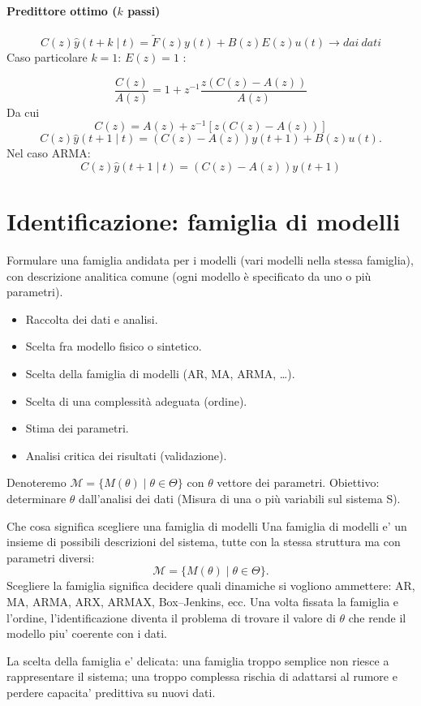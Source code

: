 \documentclass[11pt,a4paper]{article}
\begin{document}
\paragraph{Predittore ottimo ($k$ passi)} 

\[
C(z)\hat y(t+k\mid t)=\tilde F(z)y(t)+B(z)E(z)u(t) \rightarrow dai \ dati
\]
Caso particolare $k=1$: $E(z)=1$ :

\[
\frac{C(z)}{A(z)} = 1+z^{-1}\frac{z(C(z)-A(z))}{A(z)}
\]
Da cui
\[
C(z) = A(z)+z^{-1}[z(C(z)-A(z))]
\]
\[
C(z)\hat y(t+1\mid t)=(C(z)-A(z))y(t+1)+B(z)u(t).
\]
Nel caso ARMA:
\[
C(z)\hat y(t+1\mid t)=(C(z)-A(z))y(t+1)
\]
\section{Identificazione: famiglia di modelli}

Formulare una famiglia andidata per i modelli (vari modelli nella stessa famiglia), con descrizione analitica comune (ogni modello è specificato da uno o più parametri).

\begin{itemize}
  \item Raccolta dei dati e analisi.
  \item Scelta fra modello fisico o sintetico.
  \item Scelta della famiglia di modelli (AR, MA, ARMA, \dots).
  \item Scelta di una complessità adeguata (ordine).
  \item Stima dei parametri.
  \item Analisi critica dei risultati (validazione).
\end{itemize}

Denoteremo $\mathcal{M}=\{M(\theta)\mid \theta\in\Theta\}$ con $\theta$ vettore dei parametri. Obiettivo: determinare $\theta$ dall'analisi dei dati (Misura di una o più variabili sul sistema S).

\begin{spiegazione}{Che cosa significa scegliere una famiglia di modelli}
Una famiglia di modelli e' un insieme di possibili descrizioni del sistema, tutte con la stessa struttura ma con parametri diversi:
\[
\mathcal M=\{M(\theta)\mid \theta\in\Theta\}.
\]
Scegliere la famiglia significa decidere quali dinamiche si vogliono ammettere: AR, MA, ARMA, ARX, ARMAX, Box--Jenkins, ecc. Una volta fissata la famiglia e l'ordine, l'identificazione diventa il problema di trovare il valore di $\theta$ che rende il modello piu' coerente con i dati.

La scelta della famiglia e' delicata: una famiglia troppo semplice non riesce a rappresentare il sistema; una troppo complessa rischia di adattarsi al rumore e perdere capacita' predittiva su nuovi dati.
\end{spiegazione}
\end{document}
